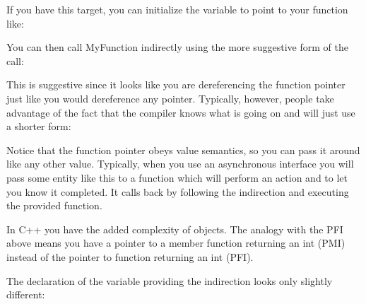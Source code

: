 \documentclass[letterpaper,10pt,english]{sphinxmanual}
\begin{document}
If you have this target, you can initialize the variable to point to your
function like:

\begin{sphinxVerbatim}[commandchars=\\\{\}]
  
\end{sphinxVerbatim}

You can then call MyFunction indirectly using the more suggestive form of the
call:

\begin{sphinxVerbatim}[commandchars=\\\{\}]
    
\end{sphinxVerbatim}

This is suggestive since it looks like you are dereferencing the function
pointer just like you would dereference any pointer. Typically, however, people
take advantage of the fact that the compiler knows what is going on and will
just use a shorter form:

\begin{sphinxVerbatim}[commandchars=\\\{\}]
    
\end{sphinxVerbatim}

Notice that the function pointer obeys value semantics, so you can pass it
around like any other value. Typically, when you use an asynchronous interface
you will pass some entity like this to a function which will perform an action
and  to let you know it completed. It calls back by following the
indirection and executing the provided function.

In C++ you have the added complexity of objects. The analogy with the PFI above
means you have a pointer to a member function returning an int (PMI) instead of
the pointer to function returning an int (PFI).

The declaration of the variable providing the indirection looks only slightly
different:

\begin{sphinxVerbatim}[commandchars=\\\{\}]
     
\end{sphinxVerbatim}
\end{document}
